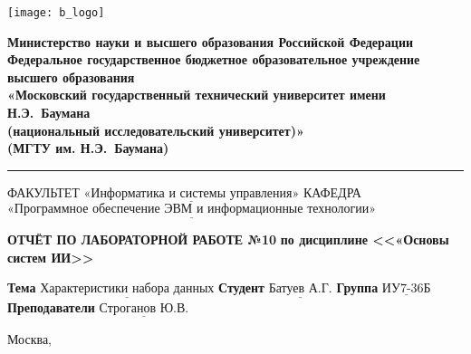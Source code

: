 \thispagestyle{empty}

\noindent \begin{minipage}{0.15\textwidth}
	\texttt{[image: b\_logo]}
\end{minipage}
\noindent\begin{minipage}{0.85\textwidth}\centering
	\textbf{Министерство науки и высшего образования Российской Федерации}\\
	\textbf{Федеральное государственное бюджетное образовательное учреждение высшего образования}\\
	\textbf{«Московский государственный технический университет имени Н.Э.~Баумана}\\
	\textbf{(национальный исследовательский университет)»}\\
	\textbf{(МГТУ им. Н.Э.~Баумана)}
\end{minipage}

\noindent\rule{\linewidth}{3pt}
\newline\newline
\noindent ФАКУЛЬТЕТ $\underline{\text{«Информатика и системы управления»}}$ \newline\newline
\noindent КАФЕДРА $\underline{\text{«Программное обеспечение ЭВМ и информационные технологии»}}$

\vspace{1cm}

\begin{center}
	\noindent\begin{minipage}{1.3\textwidth}\centering
		\Large\textbf{ОТЧЁТ ПО ЛАБОРАТОРНОЙ РАБОТЕ №10}\newline
		\textbf{по дисциплине <<«Основы систем ИИ>>}\newline\newline
	\end{minipage}
\end{center}

\noindent\textbf{Тема} $\underline{\text{Характеристики набора данных}}$\newline\newline
\noindent\textbf{Студент} $\underline{\text{Батуев А.Г.}}$\newline\newline
\noindent\textbf{Группа} $\underline{\text{ИУ7-36Б}}$\newline\newline
\noindent\textbf{Преподаватели} $\underline{\text{Строганов Ю.В.}}$\newline

\begin{center}
	\vfill
	Москва,~\the\year
\end{center}
\clearpage
